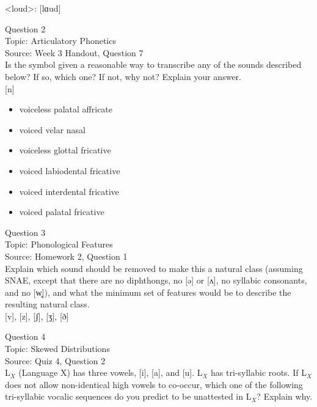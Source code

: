 \documentclass[12pt]{article}
\begin{document}
<loud>: {[lɑud]}


\newpage

{\large Question 2}\\

Topic: Articulatory Phonetics\\
Source: Week 3 Handout, Question 7\\

Is the symbol given a reasonable way to transcribe any of the sounds described below? If so, which one? If not, why not? Explain your answer.\\

{[n]}

\begin{itemize} \item voiceless palatal affricate \item voiced velar nasal \item voiceless glottal fricative \item voiced labiodental fricative \item voiced interdental fricative \item voiced palatal fricative \end{itemize}


\newpage

{\large Question 3}\\

Topic: Phonological Features\\
Source: Homework 2, Question 1\\

Explain which sound should be removed to make this a natural class (assuming SNAE, except that there are no diphthongs, no [ə] or [ʌ], no syllabic consonants, and no [w̥]), and what the minimum set of features would be to describe the resulting natural class.\\

{[v]}, {[z]}, {[ʃ]}, {[ʒ]}, {[ð]}


\newpage

{\large Question 4}\\

Topic: Skewed Distributions\\
Source: Quiz 4, Question 2\\

L$_X$ (Language X) has three vowels, [i], [a], and [u]. L$_X$ has tri-syllabic roots. If L$_X$ does not allow non-identical high vowels to co-occur, which one of the following tri-syllabic vocalic sequences do you predict to be unattested in L$_X$? Explain why.\\
\end{document}
